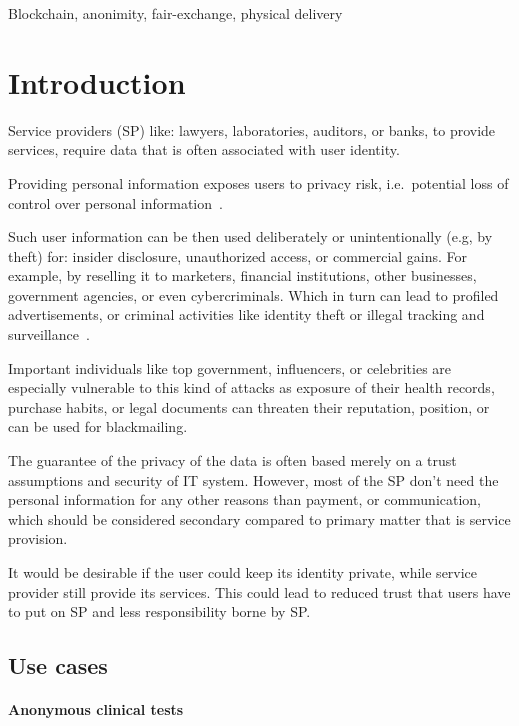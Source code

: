 \documentclass{ieeeaccess}
\begin{document}
\begin{keywords}
Blockchain, anonimity, fair-exchange, physical delivery
\end{keywords}

\titlepgskip=-15pt

\maketitle
\section{Introduction}
Service providers (SP) like: lawyers, laboratories, auditors, or banks,
to provide services, require data that is often associated with user
identity.

Providing personal information exposes users to privacy risk,
i.e.~potential loss of control over personal
information~\cite{smith2011information}.

Such user information can be then used deliberately or unintentionally
(e.g, by theft) for: insider disclosure, unauthorized access, or
commercial gains. For example, by reselling it to marketers, financial
institutions, other businesses, government agencies, or even
cybercriminals. Which in turn can lead to profiled advertisements, or
criminal activities like identity theft or illegal tracking and
surveillance~\cite{smith2011information}.

Important individuals like top government, influencers, or celebrities
are especially vulnerable to this kind of attacks as exposure of their
health records, purchase habits, or legal documents can threaten their
reputation, position, or can be used for blackmailing.

The guarantee of the privacy of the data is often based merely on a
trust assumptions and security of IT system. However, most of the SP
don't need the personal information for any other reasons than payment,
or communication, which should be considered secondary compared to
primary matter that is service provision.

It would be desirable if the user could keep its identity private, while
service provider still provide its services. This could lead to reduced
trust that users have to put on SP and less responsibility borne by SP.


\subsection{Use cases}
\paragraph{Anonymous clinical tests} \label{anonymous-clinical-tests}
\end{document}
